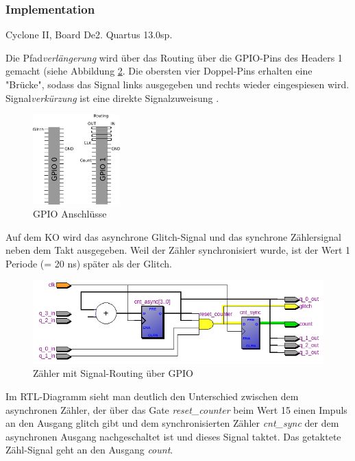 \subsubsection{Implementation} 
Cyclone II, Board De2. Quartus 13.0sp.

Die Pfad\textit{verlängerung} wird über das Routing über die GPIO-Pins des Headers 1 gemacht (siehe Abbildung \ref{fig.glitch.routing}. Die obersten vier Doppel-Pins erhalten eine "Brücke", sodass das Signal links ausgegeben und rechts wieder eingespiesen wird.\\
Signal\textit{verkürzung} ist eine direkte Signalzuweisung  .\\
\begin{figure}[H]
	\centering
	\includegraphics[width=0.3\textwidth]{images/GPIO_Belegung.png}
	\caption{GPIO Anschlüsse}
	\label{fig.glitch.routing}
\end{figure}

Auf dem KO wird das asynchrone Glitch-Signal und das synchrone Zählersignal neben dem Takt ausgegeben. Weil der Zähler synchronisiert wurde, ist der Wert 1 Periode (= 20 ns) später als der Glitch.\\

\begin{figure}[H]
	\centering
	\includegraphics[width=\textwidth]{images/RTL_glitch_detection_bemalt.png}
	\caption{Zähler mit Signal-Routing über GPIO}
	\label{fig.glitch.routing}
\end{figure}
Im RTL-Diagramm sieht man deutlich den Unterschied zwischen dem asynchronen Zähler, der über das Gate \textit{reset\_{counter}} beim Wert 15 einen Impuls an den Ausgang glitch gibt und dem synchronisierten Zähler \textit{cnt\_{sync}} der dem asynchronen Ausgang nachgeschaltet ist und dieses Signal taktet. Das getaktete Zähl-Signal geht an den Ausgang \textit{count}.

